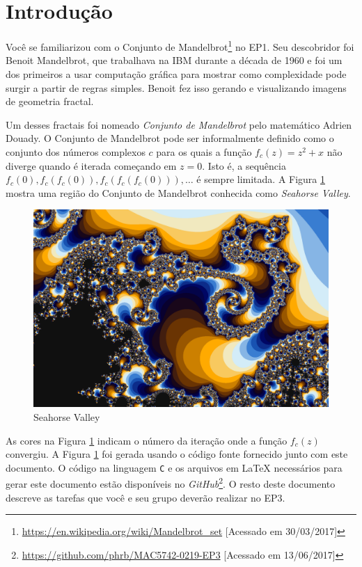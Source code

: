 \documentclass[final,12pt,a4paper]{elsarticle}
\begin{document}

\section{Introdução}

Você se familiarizou com o Conjunto de
Mandelbrot\footnote{\url{https://en.wikipedia.org/wiki/Mandelbrot_set}
[Acessado em 30/03/2017]} no EP1. Seu descobridor foi Benoit Mandelbrot, que
trabalhava na IBM durante a década de 1960 e foi um dos primeiros a usar
computação gráfica para mostrar como complexidade pode surgir a partir de
regras simples. Benoit fez isso gerando e visualizando imagens de geometria
fractal.

Um desses fractais foi nomeado \textit{Conjunto de Mandelbrot} pelo matemático
Adrien Douady.  O Conjunto de Mandelbrot pode ser informalmente definido como o
conjunto dos números complexos $c$ para os quais a função $f_c(z) = z^2 + x$
não diverge quando é iterada começando em $z = 0$. Isto é, a sequência $f_c(0),
f_c(f_c(0)), f_c(f_c(f_c(0))),\dots$ é sempre limitada. A Figura
\ref{fig:header} mostra uma região do Conjunto de Mandelbrot conhecida
como \textit{Seahorse Valley}.

\begin{figure}[htpb]
    \centering
    \includegraphics[width=.82\textwidth]{seahorse}
    \caption{Seahorse Valley}
    \label{fig:header}
\end{figure}

As cores na Figura \ref{fig:header} indicam o número da iteração onde a
função $f_c(z)$ convergiu. A Figura \ref{fig:header} foi gerada usando o
código fonte fornecido junto com este documento. O código na linguagem
\texttt{C} e os arquivos em \LaTeX{} necessários para gerar este documento
estão disponíveis no
\textit{GitHub}\footnote{\url{https://github.com/phrb/MAC5742-0219-EP3}
[Acessado em 13/06/2017]}. O resto deste documento descreve as tarefas que você
e seu grupo deverão realizar no EP3.
\end{document}
